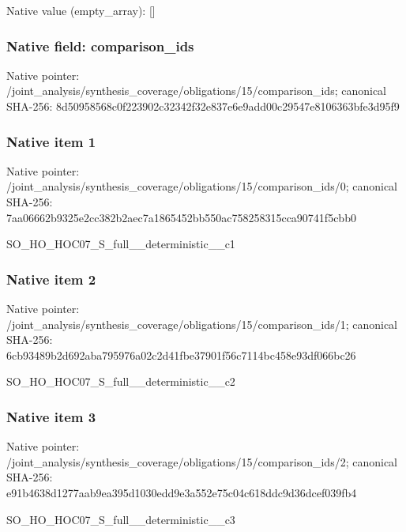 \documentclass[10pt,a4paper]{article}
\begin{document}
Native value (empty\_\allowbreak{}array): []

\subsubsection{Native field: comparison\_\allowbreak{}ids}
Native pointer: /joint\_\allowbreak{}analysis/synthesis\_\allowbreak{}coverage/obligations/15/comparison\_\allowbreak{}ids; canonical SHA-256: 8d50958568c0f223902c32342f32e837e6e9add00c29547e8106363bfe3d95f9

\subsubsection{Native item 1}
Native pointer: /joint\_\allowbreak{}analysis/synthesis\_\allowbreak{}coverage/obligations/15/comparison\_\allowbreak{}ids/0; canonical SHA-256: 7aa06662b9325e2cc382b2aec7a1865452bb550ac758258315cca90741f5cbb0

\begingroup\raggedright\sloppy SO\_\allowbreak{}HO\_\allowbreak{}HOC07\_\allowbreak{}S\_\allowbreak{}full\_\allowbreak{}\_\allowbreak{}deterministic\_\allowbreak{}\_\allowbreak{}c1\par\endgroup

\subsubsection{Native item 2}
Native pointer: /joint\_\allowbreak{}analysis/synthesis\_\allowbreak{}coverage/obligations/15/comparison\_\allowbreak{}ids/1; canonical SHA-256: 6cb93489b2d692aba795976a02c2d41fbe37901f56c7114bc458e93df066bc26

\begingroup\raggedright\sloppy SO\_\allowbreak{}HO\_\allowbreak{}HOC07\_\allowbreak{}S\_\allowbreak{}full\_\allowbreak{}\_\allowbreak{}deterministic\_\allowbreak{}\_\allowbreak{}c2\par\endgroup

\subsubsection{Native item 3}
Native pointer: /joint\_\allowbreak{}analysis/synthesis\_\allowbreak{}coverage/obligations/15/comparison\_\allowbreak{}ids/2; canonical SHA-256: e91b4638d1277aab9ea395d1030edd9e3a552e75c04c618ddc9d36dcef039fb4

\begingroup\raggedright\sloppy SO\_\allowbreak{}HO\_\allowbreak{}HOC07\_\allowbreak{}S\_\allowbreak{}full\_\allowbreak{}\_\allowbreak{}deterministic\_\allowbreak{}\_\allowbreak{}c3\par\endgroup
\end{document}
